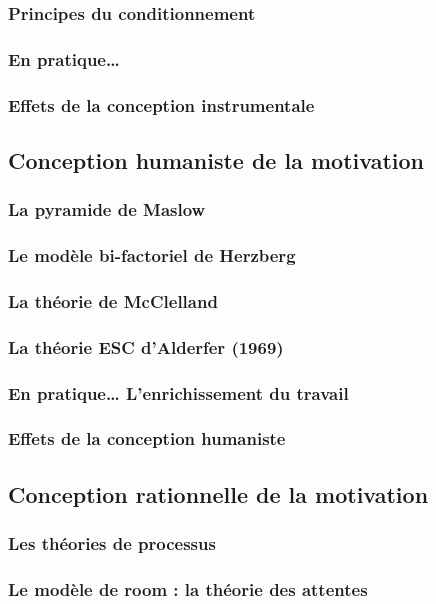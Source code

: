 \documentclass[12pt]{article}
\begin{document}
		\subsubsection{Principes du conditionnement}
		\subsubsection{En pratique…}
		\subsubsection{Effets de la conception instrumentale}
	\subsection{Conception humaniste de la motivation}
		\subsubsection{La pyramide de Maslow}
		\subsubsection{Le modèle bi-factoriel de Herzberg}
		\subsubsection{La théorie de McClelland}
		\subsubsection{La théorie ESC d’Alderfer (1969)}
		\subsubsection{En pratique… L’enrichissement du travail}
		\subsubsection{Effets de la conception humaniste}
	\subsection{Conception rationnelle de la motivation}
		\subsubsection{Les théories de processus}
		\subsubsection{Le modèle de room : la théorie des attentes}
\end{document}
